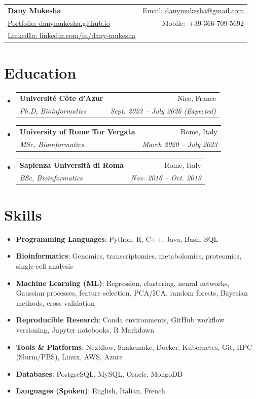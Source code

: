 \documentclass[a4paper,20pt]{article}
\makeatletter
\newcommand{\resumeItem}[2]{
  \item\small{
    \textbf{#1}{: #2 \vspace{-2pt}}
  }
}
\newcommand{\resumeSubheading}[4]{
  \vspace{-1pt}\item
    \begin{tabular*}{0.97\textwidth}{l@{\extracolsep{\fill}}r}
      \textbf{#1} & #2 \\
      \textit{#3} & \textit{#4} \\
    \end{tabular*}\vspace{-5pt}
}
\newcommand{\resumeSubItem}[2]{\resumeItem{#1}{#2}\vspace{-3pt}}
\newcommand{\resumeSubHeadingListStart}{\begin{itemize}[leftmargin=*]}
\newcommand{\resumeSubHeadingListEnd}{\end{itemize}}
\makeatother
\begin{document}
\begin{tabular*}{\textwidth}{l@{\extracolsep{\fill}}r}
  \textbf{{\LARGE Dany Mukesha}} & Email: \href{mailto:danymukesha@gmail.com}{danymukesha@gmail.com}\\
  \href{https://danymukesha.github.io}{Portfolio: danymukesha.github.io} & Mobile:~+39-366-709-5692 \\
  \href{https://linkedin.com/in/dany-mukesha}{LinkedIn: linkedin.com/in/dany-mukesha} & \\
\end{tabular*}

\section{Education}
  \resumeSubHeadingListStart
    \resumeSubheading
      {Université Côte d'Azur}{Nice, France}
      {Ph.D, Bioinformatics}{Sept. 2023 -- July 2026 (Expected)}
    \resumeSubheading
      {University of Rome Tor Vergata}{Rome, Italy}
      {MSc, Bioinformatics}{March 2020 -- July 2023}
    \resumeSubheading
      {Sapienza Università di Roma}{Rome, Italy}
      {BSc, Bioinformatics}{Nov. 2016 -- Oct. 2019}
  \resumeSubHeadingListEnd

\section{Skills}
\resumeSubHeadingListStart
  \resumeSubItem{Programming Languages}{Python, R, C++, Java, Bash, SQL}
  \resumeSubItem{Bioinformatics}{Genomics, transcriptomics, metabolomics, proteomics, single-cell analysis}
  \resumeSubItem{Machine Learning (ML)}{Regression, clustering, neural networks, Gaussian processes, feature selection, PCA/ICA, random forests, Bayesian methods, cross-validation}
  \resumeSubItem{Reproducible Research}{Conda environments, GitHub workflow versioning, Jupyter notebooks, R Markdown}
  \resumeSubItem{Tools \& Platforms}{Nextflow, Snakemake, Docker, Kubernetes, Git, HPC (Slurm/PBS), Linux, AWS, Azure}
  \resumeSubItem{Databases}{PostgreSQL, MySQL, Oracle, MongoDB}
  \resumeSubItem{Languages (Spoken)}{English, Italian, French}
\resumeSubHeadingListEnd
\end{document}
